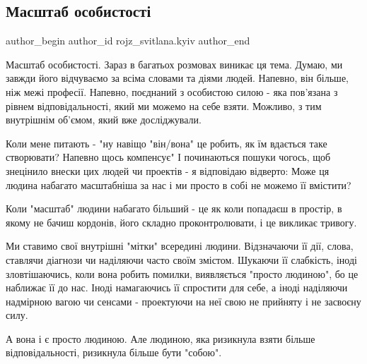  
 
 
 
 
 
\subsection{Масштаб особистості}
\label{sec:13_12_2022.fb.rojz_svitlana.kyiv.1.masshtab_osobystosti}
 
\ifcmt
 author_begin
   author_id rojz_svitlana.kyiv
 author_end
\fi

Масштаб особистості. Зараз в багатьох розмовах виникає ця тема. Думаю, ми
завжди його відчуваємо за всіма словами та діями людей. Напевно, він більше,
ніж межі професії. Напевно, поєднаний з особистою силою - яка пов'язана з
рівнем відповідальності, який ми можемо на себе взяти. Можливо, з тим
внутрішнім об'ємом, який вже досліджували. 

Коли мене питають - "ну навіщо "він/вона" це робить, як їм вдається таке
створювати? Напевно щось компенсує" І починаються пошуки чогось, щоб знецінило
внески цих людей чи проектів - я відповідаю відверто: Може ця людина набагато
масштабніша за нас і ми просто в собі не можемо її вмістити? 

Коли "масштаб" людини набагато більший - це як коли попадаєш в простір, в якому
не бачиш кордонів, його складно проконтролювати, і це викликає тривогу. 

Ми ставимо свої внутрішні "мітки" всередині людини. Відзначаючи її дії, слова,
ставлячи діагнози чи наділяючи часто своїм змістом. Шукаючи її слабкість, іноді
зловтішаючись, коли вона робить помилки, виявляється "просто людиною", бо це
наближає її до нас.  Іноді намагаючись її спростити для себе, а іноді наділяючи
надмірною вагою чи сенсами - проектуючи на неї свою не прийняту і не засвоєну
силу.

А вона і є просто людиною. Але людиною, яка ризикнула взяти більше
відповідальності, ризикнула більше бути "собою". 

